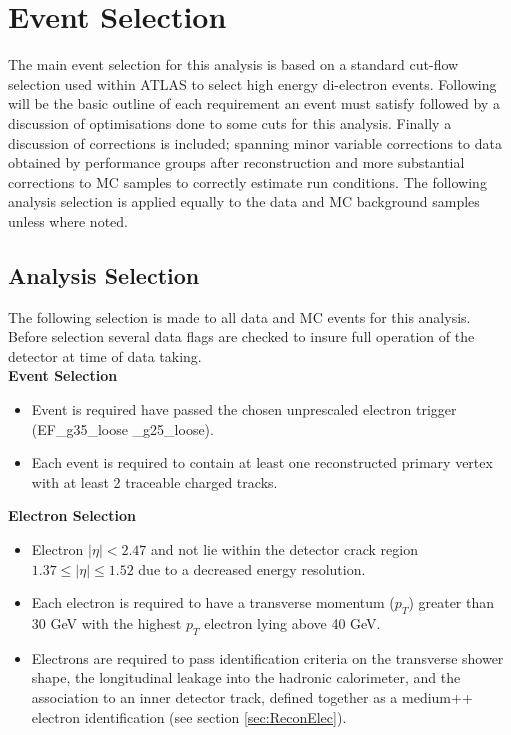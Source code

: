 \chapter{Event Selection}

The main event selection for this analysis is based on a standard cut-flow selection used within ATLAS to select high energy di-electron events. Following will be the basic outline of each requirement an event must satisfy followed by a discussion of optimisations done to some cuts for this analysis. Finally a discussion of corrections is included; spanning minor variable corrections to data obtained by performance groups after reconstruction and more substantial corrections to MC samples to correctly estimate run conditions.
The following analysis selection is applied equally to the data and MC background samples unless where noted. 


\section{Analysis Selection}

The following selection is made to all data and MC events for this analysis. Before selection several data flags are checked to insure full operation of the detector at time of data taking. \\

{\bf Event Selection}
\begin{itemize}
\item Event is required have passed the chosen unprescaled electron trigger (EF\_g35\_loose \_g25\_loose).
\item Each event is required to contain at least one reconstructed primary vertex with at least 2 traceable charged tracks.
\end{itemize}


{\bf Electron Selection}
\begin{itemize}
\item Electron $|\eta| < 2.47$ and not lie within the detector crack region $1.37 \leq |\eta| \leq 1.52$ due to a decreased energy resolution.
\item Each electron is required to have a transverse momentum ($p_{T}$) greater than 30 GeV with the highest $p_{T}$ electron lying above 40 GeV.
\item Electrons are required to pass identification criteria on the transverse shower shape, the longitudinal leakage into the hadronic calorimeter, and the association to an inner detector track, defined together as a medium++ electron identification (see section \ref{sec:ReconElec}).
\end{itemize}


